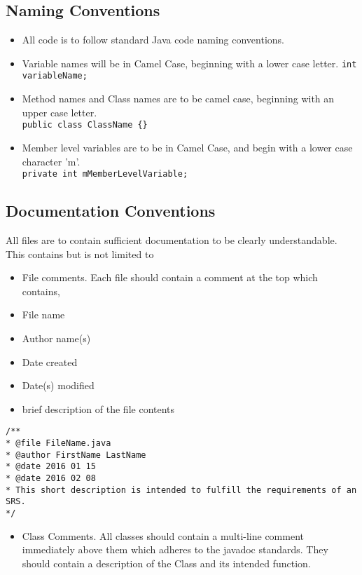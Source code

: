 \documentclass{scrreprt}
\begin{document}
\subsection{Naming Conventions}
\begin{itemize}
\item All code is to follow standard Java code naming conventions.
\item Variable names will be in Camel Case, beginning with a lower case letter.
\texttt{int variableName;}
\item Method names and Class names are to be camel case, beginning with an upper case letter. \\
\texttt{public class ClassName \{\}}
\item Member level variables are to be in Camel Case, and begin with a lower case character 'm'. \\
\texttt{private int mMemberLevelVariable;}
\end{itemize}

\subsection{Documentation Conventions}
All files are to contain sufficient documentation to be clearly understandable. This
contains but is not limited to
\begin{itemize}
\item File comments. Each file should contain a comment at the top which contains,
\item File name
\item Author name(s)
\item Date created
\item Date(s) modified
\item brief description of the file contents
\end{itemize}

\texttt{/** \\}
\texttt{* @file FileName.java \\}
\texttt{* @author FirstName LastName\\}
\texttt{* @date 2016 01 15 \\}
\texttt{* @date 2016 02 08\\}
\texttt{* This short description is intended to fulfill the requirements of an SRS. \\}
\texttt{*/ \\}

\begin{itemize}
\item Class Comments. All classes should contain a multi-line comment immediately above them which adheres to
the javadoc standards. They should contain a description of the Class and its intended function. \\
\end{itemize}
\end{document}
